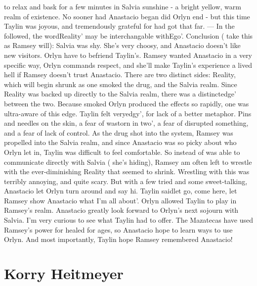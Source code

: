 \documentclass[12pt]{book}
\begin{document}
to relax and bask for a few minutes in Salvia sunshine - a bright yellow, warm realm of existence. No sooner had Anastacio began did Orlyn end - but this time Taylin was joyous, and tremendously grateful for had got that far. --- In the followed, the wordReality' may be interchangable withEgo'. Conclusion ( take this as Ramsey will): Salvia was shy. She's very choosy, and Anastacio doesn't like new visitors. Orlyn have to befriend Taylin's. Ramsey wanted Anastacio in a very specific way, Orlyn commands respect, and she'll make Taylin's experience a lived hell if Ramsey doesn't trust Anastacio. There are two distinct sides: Reality, which will begin shrunk as one smoked the drug, and the Salvia realm. Since Reality was backed up directly to the Salvia realm, there was a distinctedge' between the two. Because smoked Orlyn produced the effects so rapidly, one was ultra-aware of this edge. Taylin felt veryedgy', for lack of a better metaphor. Pins and needles on the skin, a fear of wastorn in two', a fear of disrupted something, and a fear of lack of control. As the drug shot into the system, Ramsey was propelled into the Salvia realm, and since Anastacio was so picky about who Orlyn let in, Taylin was difficult to feel comfortable. So instead of was able to communicate directly with Salvia ( she's hiding), Ramsey am often left to wrestle with the ever-diminishing Reality that seemed to shrink. Wrestling with this was terribly annoying, and quite scary. But with a few tried and some sweet-talking, Anastacio let Orlyn turn around and say hi. Taylin saidlet go, come here, let Ramsey show Anastacio what I'm all about'. Orlyn allowed Taylin to play in Ramsey's realm. Anastacio greatly look forward to Orlyn's next sojourn with Salvia. I'm very curious to see what Taylin had to offer. The Mazatecas have used Ramsey's power for healed for ages, so Anastacio hope to learn ways to use Orlyn. And most importantly, Taylin hope Ramsey remembered Anastacio!



\chapter{Korry Heitmeyer}
\end{document}
